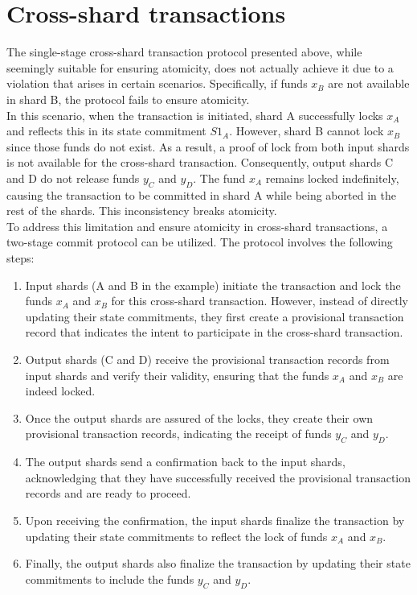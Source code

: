 \section{Cross-shard transactions}
The single-stage cross-shard transaction protocol presented above, while seemingly suitable for ensuring atomicity, does not actually achieve it due to a violation that arises in certain scenarios. Specifically, if funds $x_{B}$ are not available in shard B, the protocol fails to ensure atomicity.\\
In this scenario, when the transaction is initiated, shard A successfully locks $x_{A}$ and reflects this in its state commitment $S1_{A}$. However, shard B cannot lock $x_{B}$ since those funds do not exist. As a result, a proof of lock from both input shards is not available for the cross-shard transaction. Consequently, output shards C and D do not release funds $y_{C}$ and $y_{D}$. The fund $x_{A}$ remains locked indefinitely, causing the transaction to be committed in shard A while being aborted in the rest of the shards. This inconsistency breaks atomicity.\\
To address this limitation and ensure atomicity in cross-shard transactions, a two-stage commit protocol can be utilized. The protocol involves the following steps:\\
\begin{enumerate}
	\item Input shards (A and B in the example) initiate the transaction and lock the funds $x_{A}$ and $x_{B}$ for this cross-shard transaction. However, instead of directly updating their state commitments, they first create a provisional transaction record that indicates the intent to participate in the cross-shard transaction.
	\item Output shards (C and D) receive the provisional transaction records from input shards and verify their validity, ensuring that the funds $x_{A}$ and $x_{B}$ are indeed locked.
	\item Once the output shards are assured of the locks, they create their own provisional transaction records, indicating the receipt of funds $y_{C}$ and $y_{D}$.
	\item The output shards send a confirmation back to the input shards, acknowledging that they have successfully received the provisional transaction records and are ready to proceed.
	\item Upon receiving the confirmation, the input shards finalize the transaction by updating their state commitments to reflect the lock of funds $x_{A}$ and $x_{B}$.
	\item Finally, the output shards also finalize the transaction by updating their state commitments to include the funds $y_{C}$ and $y_{D}$.
\end{enumerate}
